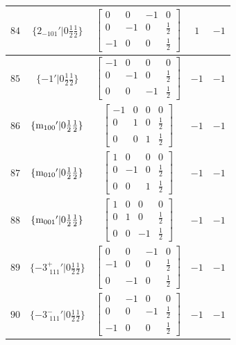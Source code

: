 \documentclass[fleqn,8pt]{jsarticle}
\begin{document}
\begin{longtable}{ccccc}
$ 84 $ & $ \{2{}_{-101}{}'|0 \frac{1}{2} \frac{1}{2}\} $ & $ \begin{bmatrix} 0 & 0 & -1 & 0 \\ 0 & -1 & 0 & \frac{1}{2} \\ -1 & 0 & 0 & \frac{1}{2} \end{bmatrix} $ & $ 1 $ & $ -1 $ \\ \hline
$ 85 $ & $ \{-1{}'|0 \frac{1}{2} \frac{1}{2}\} $ & $ \begin{bmatrix} -1 & 0 & 0 & 0 \\ 0 & -1 & 0 & \frac{1}{2} \\ 0 & 0 & -1 & \frac{1}{2} \end{bmatrix} $ & $ -1 $ & $ -1 $ \\ \hline
$ 86 $ & $ \{{\rm m}_{100}{}'|0 \frac{1}{2} \frac{1}{2}\} $ & $ \begin{bmatrix} -1 & 0 & 0 & 0 \\ 0 & 1 & 0 & \frac{1}{2} \\ 0 & 0 & 1 & \frac{1}{2} \end{bmatrix} $ & $ -1 $ & $ -1 $ \\ \hline
$ 87 $ & $ \{{\rm m}_{010}{}'|0 \frac{1}{2} \frac{1}{2}\} $ & $ \begin{bmatrix} 1 & 0 & 0 & 0 \\ 0 & -1 & 0 & \frac{1}{2} \\ 0 & 0 & 1 & \frac{1}{2} \end{bmatrix} $ & $ -1 $ & $ -1 $ \\ \hline
$ 88 $ & $ \{{\rm m}_{001}{}'|0 \frac{1}{2} \frac{1}{2}\} $ & $ \begin{bmatrix} 1 & 0 & 0 & 0 \\ 0 & 1 & 0 & \frac{1}{2} \\ 0 & 0 & -1 & \frac{1}{2} \end{bmatrix} $ & $ -1 $ & $ -1 $ \\ \hline
$ 89 $ & $ \{-3^{+}_{\,\,111}{}'|0 \frac{1}{2} \frac{1}{2}\} $ & $ \begin{bmatrix} 0 & 0 & -1 & 0 \\ -1 & 0 & 0 & \frac{1}{2} \\ 0 & -1 & 0 & \frac{1}{2} \end{bmatrix} $ & $ -1 $ & $ -1 $ \\ \hline
$ 90 $ & $ \{-3^{-}_{\,\,111}{}'|0 \frac{1}{2} \frac{1}{2}\} $ & $ \begin{bmatrix} 0 & -1 & 0 & 0 \\ 0 & 0 & -1 & \frac{1}{2} \\ -1 & 0 & 0 & \frac{1}{2} \end{bmatrix} $ & $ -1 $ & $ -1 $ \\ \hline

\end{longtable}
\end{document}
